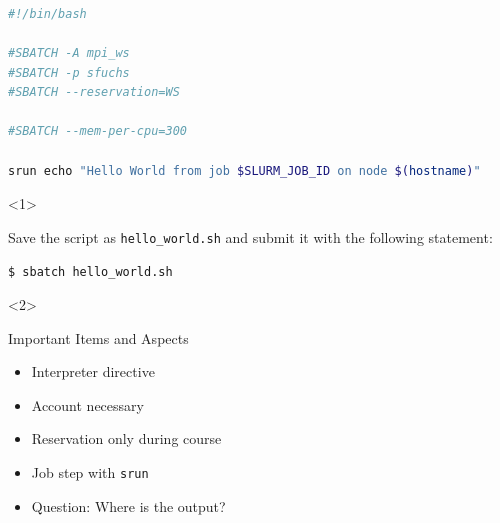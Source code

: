 \begin{frame}[fragile]
	\setcounter{handson}{\value{preframe_handson}}
	\frametitle{}
	\vspace{-2em}
	\begin{minipage}[t][0.32\textheight][t]{1.0\linewidth}
		\begin{lstlisting}[language=Bash, style=Shell, basicstyle=\scriptsize]
#!/bin/bash
			
#SBATCH -A mpi_ws
#SBATCH -p sfuchs
#SBATCH --reservation=WS

#SBATCH --mem-per-cpu=300

srun echo "Hello World from job $SLURM_JOB_ID on node $(hostname)"
		\end{lstlisting}
	\end{minipage}\newline
	\begin{minipage}[t][0.3\textheight][t]{1.0\linewidth}
		\begin{onlyenv}<1>
			\begin{task}
				Save the script as \texttt{hello\_world.sh} and submit it with the following statement:
			\end{task}
			\begin{lstlisting}[language=Bash, style=Shell, basicstyle=\footnotesize]
$ sbatch hello_world.sh
			\end{lstlisting}
		\end{onlyenv}
		\begin{onlyenv}<2>
			\begin{block}{Important Items and Aspects}
				\begin{itemize}
					\item Interpreter directive
					\item Account necessary
					\item Reservation only during course
					\item Job step with \texttt{srun}
					\item Question: Where is the output?
				\end{itemize}
			\end{block}
		\end{onlyenv}
	\end{minipage}
	\vfill
\end{frame}
